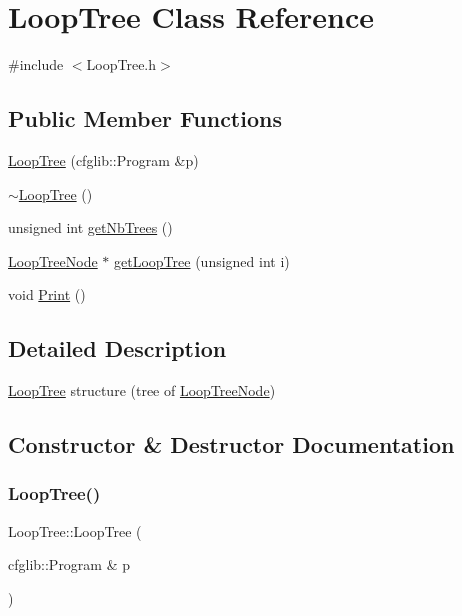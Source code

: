 \hypertarget{classLoopTree}{}\section{Loop\+Tree Class Reference}
\label{classLoopTree}


{\ttfamily \#include $<$Loop\+Tree.\+h$>$}

\subsection*{Public Member Functions}
\begin{DoxyCompactItemize}
\item 
\hyperlink{classLoopTree_a5fcc67c7c5401ac7cb4157eac09b595e}{Loop\+Tree} (cfglib\+::\+Program \&p)
\item 
\hyperlink{classLoopTree_ac7a3306c81d41d6cea849992f3fec9ce}{$\sim$\+Loop\+Tree} ()
\item 
unsigned int \hyperlink{classLoopTree_a16abfb41144829dfe1467d4eb407d69b}{get\+Nb\+Trees} ()
\item 
\hyperlink{classLoopTreeNode}{Loop\+Tree\+Node} $\ast$ \hyperlink{classLoopTree_a1f6d82fd0d862324a8c6e042350f4209}{get\+Loop\+Tree} (unsigned int i)
\item 
void \hyperlink{classLoopTree_ae2c8fc6279ddc72886e67cd89f28736d}{Print} ()
\end{DoxyCompactItemize}


\subsection{Detailed Description}
\hyperlink{classLoopTree}{Loop\+Tree} structure (tree of \hyperlink{classLoopTreeNode}{Loop\+Tree\+Node}) 

\subsection{Constructor \& Destructor Documentation}
\mbox{\label{classLoopTree_a5fcc67c7c5401ac7cb4157eac09b595e}} 
\subsubsection{\texorpdfstring{Loop\+Tree()}{LoopTree()}}
{\footnotesize\ttfamily Loop\+Tree\+::\+Loop\+Tree (\begin{DoxyParamCaption}\item[{cfglib\+::\+Program \&}]{p }\end{DoxyParamCaption})}

